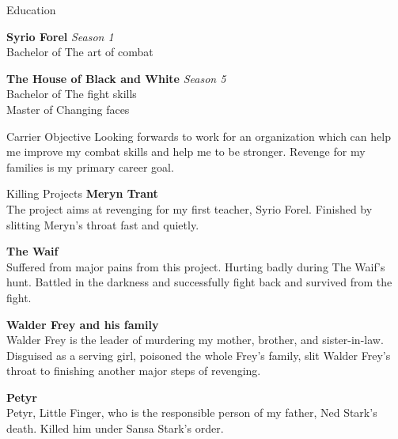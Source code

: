 \documentclass{resume}
\begin{document}

\begin{rSection}{Education}

{\bf Syrio Forel} \hfill {\em Season 1}
\\Bachelor of The art of combat



{\bf The House of Black and White} \hfill {\em Season 5} 
\\Bachelor of The fight skills 
\\Master of Changing faces 


\end{rSection}

\begin{rSection}{Carrier Objective}
Looking forwards to work for an organization which can help me improve my combat skills and help me to be stronger. Revenge for my families is my primary career goal.
\end{rSection}
\begin{rSection}{Killing Projects}
{\bf Meryn Trant}
\\The project aims at revenging for my first teacher, Syrio Forel. Finished by slitting Meryn's throat fast and quietly.

{\bf The Waif}\\
Suffered from major pains from this project. Hurting badly during The Waif's hunt. Battled in the darkness and successfully fight back and survived from the fight.

{\bf Walder Frey and his family}\\
Walder Frey is the leader of murdering my mother, brother, and sister-in-law. Disguised as a serving girl, poisoned the whole Frey's family, slit Walder Frey's throat to finishing another major steps of revenging.

{\bf Petyr}\\
Petyr, Little Finger, who is the responsible person of my father, Ned Stark's death. Killed him under Sansa Stark's order. 


\end{rSection}
\end{document}
